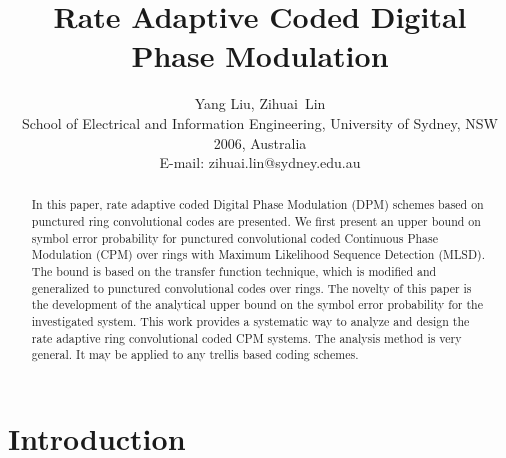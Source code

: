 \documentclass[12pt,twoside,onecolumn,a4paper,english]{IEEEtran2e}
\begin{document}
\title{\bf{Rate Adaptive Coded Digital Phase Modulation}}

\author{Yang Liu, Zihuai~Lin \\
 School of Electrical and Information Engineering, University of Sydney, NSW 2006, Australia\\ E-mail:
zihuai.lin@sydney.edu.au\\
}
\maketitle

\begin{abstract}
In this paper, rate adaptive coded Digital Phase Modulation (DPM) schemes based on punctured
ring convolutional codes are presented. We first present an upper
bound on symbol error probability for  punctured convolutional
coded Continuous Phase Modulation (CPM) over rings with Maximum
Likelihood Sequence Detection (MLSD). The bound is based on the
transfer function technique, which is modified and generalized to
punctured convolutional codes over rings.  %
The novelty of this paper is the development of the analytical upper bound on the symbol error probability for the investigated system.
This work provides a systematic
way to analyze and design the rate adaptive ring convolutional coded CPM systems. The analysis method
is very general. It may be applied to any trellis based coding
schemes.
\end{abstract}


{} %

\section{Introduction}
\end{document}
